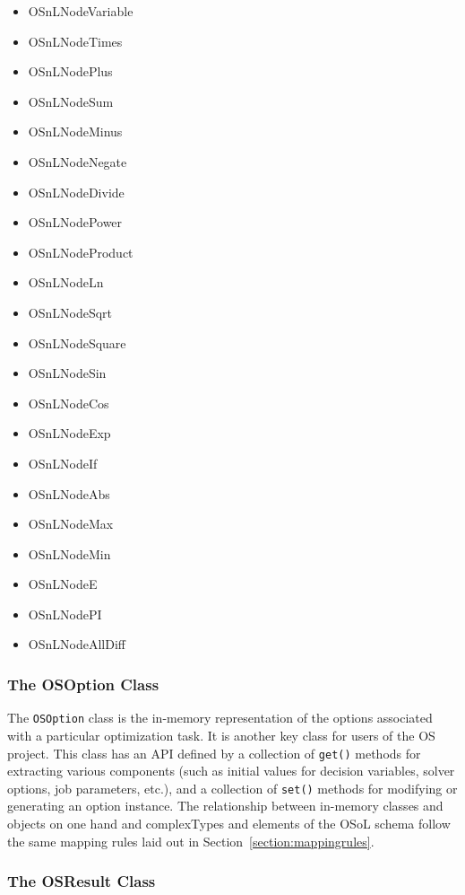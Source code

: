 \documentclass[11pt]{article}
\renewcommand{\_}{{\char"5F}}
\renewcommand{\{}{{\char"7B}}
\renewcommand{\}}{{\char"7D}}
\renewcommand{\^}{{\char"0D}}
\renewcommand{\'}{{\char"0D}}
\begin{document}
\begin{enumerate}[Step 1:]
\begin{itemize}
\item OSnLNodeVariable
\item OSnLNodeTimes
\item OSnLNodePlus
\item OSnLNodeSum
\item OSnLNodeMinus
\item OSnLNodeNegate
\item OSnLNodeDivide
\item OSnLNodePower
\item OSnLNodeProduct
\item OSnLNodeLn
\item OSnLNodeSqrt
\item OSnLNodeSquare
\item OSnLNodeSin
\item OSnLNodeCos
\item OSnLNodeExp
\item OSnLNodeIf
\item OSnLNodeAbs
\item OSnLNodeMax
\item OSnLNodeMin
\item OSnLNodeE
\item OSnLNodePI
\item OSnLNodeAllDiff
\end{itemize}



\subsubsection{The OSOption Class}\label{section:osoptionclass}

The {\tt OSOption} class is the in-memory representation of the options 
associated with a particular optimization task. It is another key
class for users of the OS project. This class has an API defined by a collection of {\tt get()} methods for
extracting various components (such as initial values for decision variables, solver options, job parameters, etc.), 
and a collection of {\tt set()} methods for modifying or generating an option instance. The relationship between
in-memory classes and objects on one hand and complexTypes and elements of the OSoL schema follow the same mapping rules
laid out in Section~\ref{section:mappingrules}.

\subsubsection{The OSResult Class}\label{section:osresultclass}


\end{enumerate}
\end{document}
